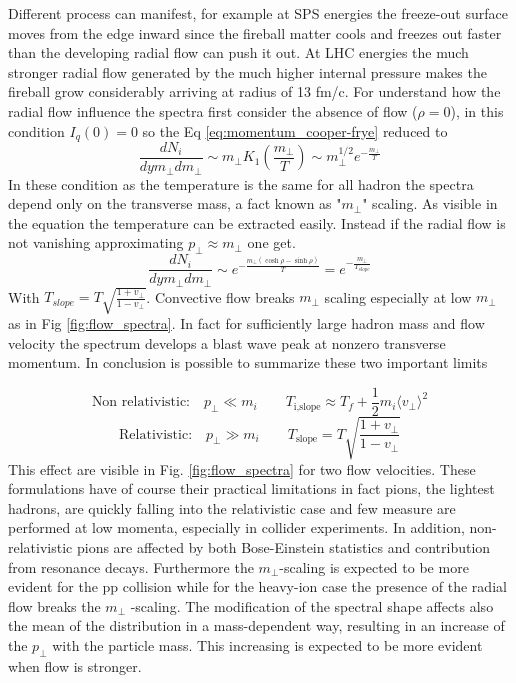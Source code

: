 \documentclass[12pt,a4paper]{book}
\begin{document}
	Different process can manifest, for example	at SPS energies the freeze-out surface moves from the edge inward since the fireball matter cools and freezes out faster than the developing radial flow can push it out. At LHC energies the much stronger radial flow generated by the much higher internal pressure makes the fireball grow considerably arriving at radius of 13 fm/c. 
	For understand how the radial flow influence the spectra first consider the absence of flow ($\rho=0$), in this condition $I_q(0)=0$ so the Eq \ref{eq:momentum_cooper-frye} reduced to
	\begin{equation}
		\frac{dN_i}{dy m_\perp dm_\perp} \sim m_\perp K_1	\left(\frac{m_\perp}{T}\right) \sim m_\perp^{1/2} e^{- \frac{m_\perp}{T}}
		\label{eq:vanish_rad_flow}
	\end{equation}
	In these condition as the temperature is the same for all hadron the spectra depend only on the transverse mass, a fact known as "$m_\perp$" scaling. As visible in the equation the temperature can be extracted easily. Instead if the radial flow is not vanishing approximating $p_\perp \approx m_\perp$ one get.
	\begin{equation}
		\frac{dN_i}{dy m_\perp dm_\perp} \sim  e^{- \frac{m_\perp (\cosh \rho - \sinh \rho)}{T}} =  e^{- \frac{m_\perp}{T_{slope}}}
		\label{eq:no_vanish_rad_flow}
	\end{equation}
	With $T_{slope} = T \sqrt{\frac{1+v_\perp}{1-v_\perp}}$. Convective flow breaks $m_\perp$ scaling especially at low $m_\perp$ as in Fig \ref{fig:flow_spectra}. In fact for sufficiently large hadron mass and flow velocity the spectrum develops a blast wave peak at nonzero transverse momentum. In conclusion is possible to summarize these two important limits
	
	\begin{equation}
		\text{Non relativistic:}\quad p_\perp \ll m_i \qquad T_{\text{i,slope}} \approx T_f + \frac{1}{2} m_i \langle v_\perp \rangle^2
		\label{eq:T_norel_limit}
	\end{equation}
	\begin{equation}
		\text{Relativistic:}\quad p_\perp \gg m_i \qquad T_{\text{slope}} = T \sqrt{\frac{1+v_\perp}{1-v_\perp}}
		\label{eq:T_rel_limit}
	\end{equation}
	This effect are visible in Fig. \ref{fig:flow_spectra} for two flow velocities. These formulations have of course their practical limitations in fact pions, the lightest hadrons, are quickly falling into the relativistic case and few measure are performed at low momenta, especially in collider experiments. In addition, non-relativistic pions are affected by both Bose-Einstein statistics and contribution from resonance decays. Furthermore the $m_\perp$-scaling is expected to be more evident for the pp collision while for the heavy-ion case the presence of the radial flow breaks the $m_\perp$ -scaling. The modification of the spectral shape affects also the mean of the distribution in a mass-dependent way, resulting in an increase of the $p_\perp$ with the particle mass. This increasing is expected to be more evident when flow is stronger.
	
\end{document}
